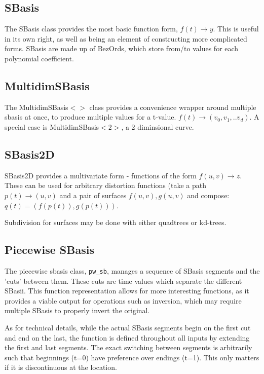 \documentclass{book}
\newcommand{\code}[1]{\textsf{#1}}
\begin{document}
\subsection{SBasis}
The \code{SBasis} class provides the most basic function form,
$f(t) \rightarrow y$.  This is useful in its own right, as well as being an
element of constructing more complicated forms.  \code{SBasis} are made
up of \code{BezOrd}s, which store from/to values for each polynomial
coefficient.

\subsection{MultidimSBasis}
The \code{MultidimSBasis$<>$} class provides a convenience wrapper
around multiple sbasis at once, to produce multiple values for a t-value.
$f(t) \rightarrow (v_0, v_1, .. v_d)$.  A special case is \code{MultidimSBasis$<2>$},
a 2 diminsional curve.

\subsection{SBasis2D}
SBasis2D provides a multivariate form - functions of the form
$f(u,v) \rightarrow z$.  These can be used for arbitrary distortion
functions (take a path $p(t) \rightarrow (u,v)$ and a pair of surfaces
$f(u,v),g(u,v)$ and compose: $q(t) = (f(p(t)), g(p(t)))$.

Subdivision for surfaces may be done with either quadtrees or kd-trees.

\subsection{Piecewise SBasis}
The piecewise sbasis class, \verb#pw_sb#, manages a sequence of SBasis
segments and the 'cuts' between them.  These cuts are time values which
separate the different SBasii.  This function representation allows for
more interesting functions, as it provides a viable output for operations
such as inversion, which may require multiple SBasis to properly invert
the original.

As for technical details, while the actual SBasis segments begin on the
first cut and end on the last, the function is defined throughout all
inputs by extending the first and last segments.  The exact switching
between segments is arbitrarily such that beginnings (t=0) have
preference over endings (t=1).  This only matters if it is discontinuous
at the location.
\end{document}
